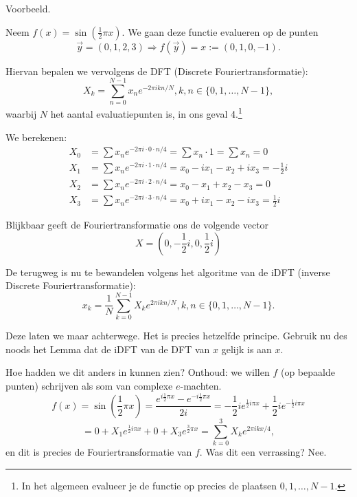 \documentclass[11pt]{amsart}
\theoremstyle{definition}
\begin{document}
\title{}
\author{Jan Westerdiep}
\maketitle

Voorbeeld.

Neem $f(x) = \sin( \frac{1}{2} \pi x )$. We gaan deze functie evalueren op de punten
\[
\vec{y} = (0, 1, 2, 3) \Rightarrow f(\vec{y}) = x := (0, 1, 0, -1).
\]

Hiervan bepalen we vervolgens de DFT (Discrete Fouriertransformatie):
\[
  X_k = \sum_{n=0}^{N-1} x_n e^{- 2 \pi i k n / N}, k,n \in \{0,1,\ldots,N-1\},
\]
waarbij $N$ het aantal evaluatiepunten is, in ons geval 4.\footnote{In het algemeen evalueer je de functie op precies de plaatsen $0,1,\ldots,N-1$.}

We berekenen:
\begin{align*}
  X_0 &= \sum x_n e^{-2 \pi i\cdot 0 \cdot n/4} = \sum x_n \cdot 1 = \sum x_n = 0 \\
  X_1 &= \sum x_n e^{-2 \pi i\cdot 1 \cdot n/4} = x_0 - i x_1 - x_2 + i x_3 = -\frac{1}{2}i \\
  X_2 &= \sum x_n e^{-2 \pi i\cdot 2 \cdot n/4} = x_0 - x_1 + x_2 - x_3 = 0 \\
  X_3 &= \sum x_n e^{-2 \pi i\cdot 3 \cdot n/4} = x_0 + i x_1 - x_2 - i x_3 = \frac{1}{2} i
\end{align*}

Blijkbaar geeft de Fouriertransformatie ons de volgende vector
\[
  X = (0, -\frac{1}{2}i, 0, \frac{1}{2}i)
\]

De terugweg is nu te bewandelen volgens het algoritme van de iDFT (inverse Discrete Fouriertransformatie):
\[
  x_k = \frac{1}{N}\sum_{k=0}^{N-1} X_k e^{2 \pi i k n / N}, k,n \in \{ 0, 1, \ldots, N-1 \}.
\]

Deze laten we maar achterwege. Het is precies hetzelfde principe. Gebruik nu des noods het Lemma dat de iDFT van de DFT van $x$ gelijk is aan $x$.

Hoe hadden we dit anders in kunnen zien? Onthoud: we willen $f$ (op bepaalde punten) schrijven als som van complexe $e$-machten.
\[
f(x) = \sin( \frac{1}{2} \pi x) = \frac{ e^{i \frac{1}{2} \pi x} - e^{- i \frac{1}{2} \pi x} }{2 i} = -\frac{1}{2}i e^{\frac{1}{2} i \pi x} + \frac{1}{2} i e^{-\frac{1}{2} i \pi x}
\]
\[
= 0 + X_1 e^{\frac{1}{2} i \pi x} + 0 + X_3 e^{\frac{3}{2} \pi x} = \sum_{k=0}^{3} X_k e^{2 \pi i k x/4},
\]
en dit is precies de Fouriertransformatie van $f$. Was dit een verrassing? Nee.
\end{document}
